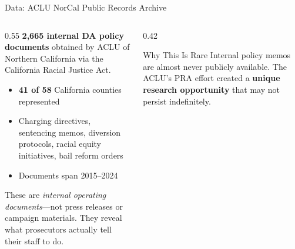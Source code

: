 \documentclass[aspectratio=169, 11pt]{beamer}
\begin{document}
\begin{frame}{Data: ACLU NorCal Public Records Archive}
\begin{columns}[T]
\begin{column}{0.55\textwidth}
\textbf{2,665 internal DA policy documents} obtained by ACLU of Northern California via the California Racial Justice Act.
\begin{itemize}
    \item \textbf{41 of 58} California counties represented
    \item Charging directives, sentencing memos, diversion protocols, racial equity initiatives, bail reform orders
    \item Documents span 2015--2024
\end{itemize}
\vspace{4pt}
These are \emph{internal operating documents}---not press releases or campaign materials. They reveal what prosecutors actually tell their staff to do.
\end{column}
\begin{column}{0.42\textwidth}
\begin{block}{Why This Is Rare}
Internal policy memos are almost never publicly available. The ACLU's PRA effort created a \textbf{unique research opportunity} that may not persist indefinitely.
\end{block}
\end{column}
\end{columns}
\end{frame}
\end{document}
